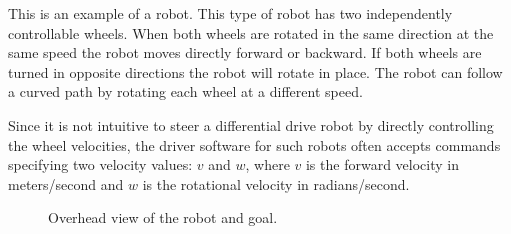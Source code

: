 

This is an example of a  robot.  This type of robot has two independently controllable
wheels.  When both wheels are rotated in the same direction at the
same speed the robot moves directly forward or backward.  If both
wheels are turned in opposite directions the robot will rotate in
place.  The robot can follow a curved path by rotating each wheel at a
different speed.

Since it is not intuitive to steer a differential drive robot by
directly controlling the wheel velocities, the driver software for
such robots often accepts commands specifying two velocity values: $v$
and $w$, where $v$ is the forward velocity in meters/second and $w$ is
the rotational velocity in radians/second. 

\begin{figure}[h!]
\begin{center}
\end{center}
\caption{Overhead view of the robot and goal.}
\label{fig:diff_coords}
\end{figure}

